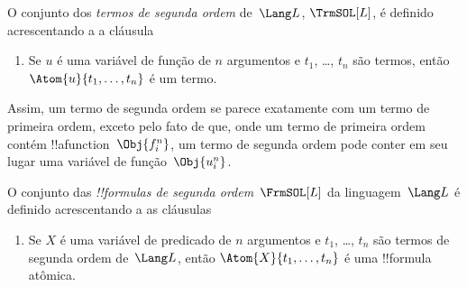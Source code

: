 \documentclass[../../../include/open-logic-section]{subfiles}
\begin{document}
\begin{defn}
O conjunto dos \emph{termos de segunda ordem} de~$\Lang L$, $\TrmSOL[L]$,
é definido acrescentando a  a cláusula
\begin{enumerate}
\item Se $u$ é uma variável de função de $n$ argumentos e $t_1$, \dots,
  $t_n$ são termos, então $\Atom{u}{t_1, \ldots, t_n}$ é um termo.
\end{enumerate}
\end{defn}

\begin{explain}
Assim, um termo de segunda ordem se parece exatamente com um termo de
primeira ordem, exceto pelo fato de que, onde um termo de primeira ordem
contém !!a{function}~$\Obj{f^n_i}$, um termo de segunda ordem pode conter em
seu lugar uma variável de função~$\Obj{u^n_i}$.
\end{explain}

\begin{defn}
O conjunto das \emph{!!{formula}s de segunda ordem}~$\FrmSOL[L]$ da
linguagem~$\Lang L$ é definido acrescentando a
 as cláusulas
\begin{enumerate}
\item Se $X$ é uma variável de predicado de $n$ argumentos e $t_1$, \dots,
  $t_n$ são termos de segunda ordem de~$\Lang L$, então
  $\Atom{X}{t_1,\ldots, t_n}$ é uma !!{formula} atômica.




\end{enumerate}
\end{defn}
\end{document}
